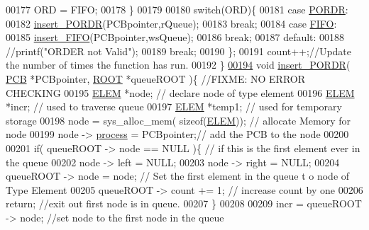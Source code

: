 \begin{DoxyCode}
{00177                 ORD  = FIFO; 
00178         \}
00179         
00180    \textcolor{keywordflow}{switch}(ORD)\{
00181                 \textcolor{keywordflow}{case} \hyperlink{mpx__r2_8h_ace032edafb5fe32666cf53a1e7a957e0}{PORDR}:
00182                         \hyperlink{mpx__r2_8c_a722f27bfb24e46ffd7eb86fb34024ed9}{insert_PORDR}(PCBpointer,rQueue);
00183                         \textcolor{keywordflow}{break};
00184                 \textcolor{keywordflow}{case} \hyperlink{mpx__r2_8h_af6bc2702f6a1a4bb063b0726d90999da}{FIFO}:
00185                         \hyperlink{mpx__r2_8c_a58a3e3525ed6385f632835b55ab7d7d1}{insert_FIFO}(PCBpointer,wsQueue);
00186                         \textcolor{keywordflow}{break};
00187                 \textcolor{keywordflow}{default}:
00188                         \textcolor{comment}{//printf("ORDER not Valid");}
00189                         \textcolor{keywordflow}{break};
00190                 \};
00191         count++;\textcolor{comment}{//Update the number of times the function has run.}
00192 \}
\hypertarget{mpx__r2_8c_source_l00194}{}\hyperlink{mpx__r2_8h_a9a582eea14fd6628937fb0891220fa82}{00194} \textcolor{keywordtype}{void} \hyperlink{mpx__r2_8c_a722f27bfb24e46ffd7eb86fb34024ed9}{insert_PORDR}( \hyperlink{structprocess}{PCB} *PCBpointer, \hyperlink{structroot}{ROOT} *queueROOT )\{ \textcolor{comment}{//FIXME: NO ERROR CHECKING
      }
00195         \hyperlink{structpage}{ELEM} *node; \textcolor{comment}{// declare node of type element}
00196         \hyperlink{structpage}{ELEM} *incr; \textcolor{comment}{// used to traverse queue}
00197         \hyperlink{structpage}{ELEM} *temp1; \textcolor{comment}{// used for temporary storage }
00198         node = sys\_alloc\_mem( \textcolor{keyword}{sizeof}(\hyperlink{structpage}{ELEM})); \textcolor{comment}{// allocate Memory for node}
00199         node -> \hyperlink{structprocess}{process} = PCBpointer;\textcolor{comment}{// add the PCB to the node}
00200         
00201         \textcolor{keywordflow}{if}( queueROOT -> node == NULL )\{ \textcolor{comment}{// if this is the first element ever in 
      the queue}
00202                 node -> left = NULL;
00203                 node -> right = NULL;
00204                 queueROOT -> node = node; \textcolor{comment}{// Set the first element in the queue t
      o node of Type Element}
00205                 queueROOT -> count += 1; \textcolor{comment}{// increase count by one}
00206                 \textcolor{keywordflow}{return}; \textcolor{comment}{//exit out first node is in queue. }
00207         \}
00208         
00209         incr = queueROOT -> node; \textcolor{comment}{//set node to the first node in the queue}
}
\end{DoxyCode}
